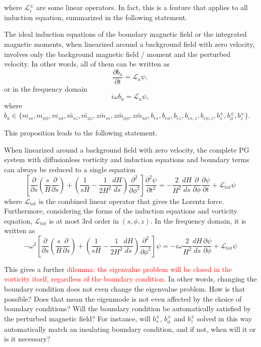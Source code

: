 where $\mathcal{L}_i^{\pm}$ are some linear operators. In fact, this is a feature that applies to all induction equation, summarized in the following statement.
\begin{proposition}
    The ideal induction equations of the boundary magnetic field or the integrated magnetic moments, when linearized around a background field with zero velocity, involves only the background magnetic field / moment and the perturbed velocity. In other words, all of them can be written as
    \[
        \frac{\partial b_a}{\partial t} = \mathcal{L}_a \psi,
    \]
    or in the frequency domain
    \[
        i\omega b_a = \mathcal{L}_a \psi,
    \]
    where $b_a \in \{\overline{m_{ss}},\overline{m_{\phi\phi}},\overline{m_{s\phi}},\widetilde{m_{sz}},\widetilde{m_{\phi z}},\widetilde{zm_{ss}},\widetilde{zm_{\phi\phi}},\widetilde{zm_{s\phi}},b_{es},b_{e\phi},b_{ez},b_{es,z},b_{e\phi,z},b_s^\pm,b_\phi^\pm,b_z^\pm\}$.
\end{proposition}
This proposition leads to the following statement.
\begin{corollary}
    \label{corollary:reduced-eigen}
    When linearized around a background field with zero velocity, the complete PG system with diffusionless vorticity and induction equations and boundary terms can always be reduced to a single equation
    \[
        \left[\frac{\partial}{\partial s}\left(\frac{s}{H}\frac{\partial}{\partial s}\right) + \left(\frac{1}{sH} - \frac{1}{2H^2} \frac{dH}{ds}\right)\frac{\partial^2}{\partial \phi^2}\right] \frac{\partial^2 \psi}{\partial t^2} = - \frac{2}{H^2}\frac{dH}{ds} \frac{\partial}{\partial \phi}\frac{\partial \psi}{\partial t} + \mathcal{L}_\mathrm{tot} \psi
    \]
    where $\mathcal{L}_\mathrm{tot}$ is the combined linear operator that gives the Lorentz force. Furthermore, considering the forms of the induction equations and vorticity equation, $\mathcal{L}_\mathrm{tot}$ is at most 3rd order in $(s,\phi,z)$. In the frequency domain, it is written as
    \[
        -\omega^2\left[\frac{\partial}{\partial s}\left(\frac{s}{H}\frac{\partial}{\partial s}\right) + \left(\frac{1}{sH} - \frac{1}{2H^2} \frac{dH}{ds}\right)\frac{\partial^2}{\partial \phi^2}\right] \psi = -i\omega \frac{2}{H^2}\frac{dH}{ds} \frac{\partial \psi}{\partial \phi} + \mathcal{L}_\mathrm{tot} \psi
    \]
\end{corollary}

This gives a further \textcolor{red}{dilemma: the eigenvalue problem will be closed in the vorticity itself, regardless of the boundary condition.} In other words, changing the boundary condition does not even change the eigenvalue problem. How is that possible? Does that mean the eigenmode is not even affected by the choice of boundary conditions? Will the boundary condition be automatically satisfied by the perturbed magnetic field? For instance, will $b_s^\pm$, $b_\phi^\pm$ and $b_z^\pm$ solved in this way automatically match an insulating boundary condition, and if not, when will it or is it necessary?

